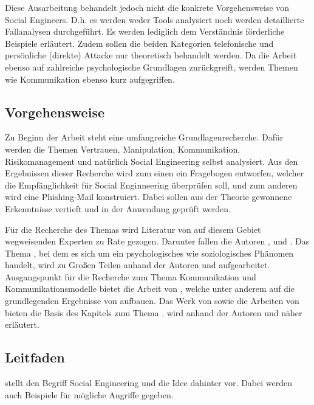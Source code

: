 Diese Ausarbeitung behandelt jedoch nicht die konkrete Vorgehensweise von Social Engineers.
D.h. es werden weder Tools analysiert noch werden detaillierte Fallanalysen durchgeführt.
Es werden lediglich dem Verständnis förderliche Beispiele erläutert.
Zudem sollen die beiden Kategorien telefonische und persönliche (direkte) Attacke nur theoretisch behandelt werden.
Da die Arbeit ebenso auf zahlreiche psychologische Grundlagen zurückgreift, werden Themen wie  Kommunikation ebenso kurz aufgegriffen.
 	

\subsection{Vorgehensweise}\label{sec:vorgehensweise}
Zu Beginn der Arbeit steht eine umfangreiche Grundlagenrecherche.
Dafür werden die Themen Vertrauen, Manipulation, Kommunikation, Risikomanagement und natürlich Social Engineering selbst analysiert.
Aus den Ergebnissen dieser Recherche wird zum einen ein Fragebogen entworfen, welcher die Empfänglichkeit für Social Enginneering überprüfen soll, und zum anderen wird eine Phishing-Mail konstruiert.
Dabei sollen aus der Theorie gewonnene Erkenntnisse vertieft und in der Anwendung geprüft werden.

Für die Recherche des Themas  wird Literatur von auf diesem Gebiet wegweisenden Experten zu Rate gezogen. Darunter fallen die Autoren ,  und .
Das Thema , bei dem es sich um ein psychologisches wie soziologisches Phänomen handelt, wird zu Großen Teilen anhand der Autoren  und  aufgearbeitet.
Ausgangspunkt für die Recherche zum Thema Kommunikation und Kommunikationsmodelle bietet die Arbeit  von , welche unter anderem auf die grundlegenden Ergebnisse von  aufbauen.
Das Werk  von  sowie die Arbeiten von  bieten die Basis des Kapitels zum Thema .
 wird anhand der Autoren  und  näher erläutert.

\subsection{Leitfaden}\label{sec:aufbau_der_arbeit}
 stellt den Begriff Social Engineering und die Idee dahinter vor.
Dabei werden auch Beispiele für mögliche Angriffe gegeben.

